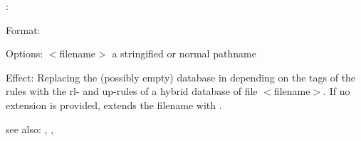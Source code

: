 :

Format: 

Options: $<$filename$>$ a stringified or normal pathname

Effect: Replacing the (possibly empty) database  in \COLAB{} 
	depending on the tags of the rules with the rl- and up-rules of a hybrid
	database of file $<$filename$>$.
        If no extension is provided, \COLAB{} extends the filename with .

see also: \consult, \destroy, \replace
